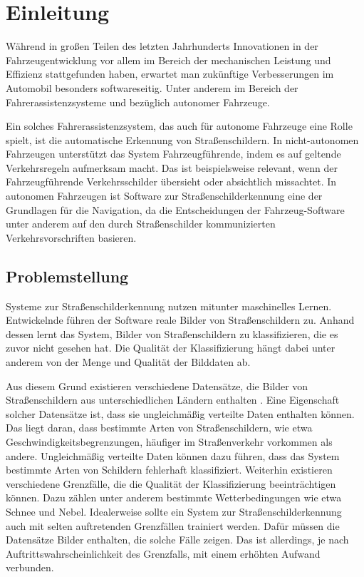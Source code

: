 \chapter{Einleitung}

Während in großen Teilen des letzten Jahrhunderts Innovationen in der Fahrzeugentwicklung vor allem im Bereich der mechanischen Leistung und Effizienz stattgefunden haben, erwartet man zukünftige Verbesserungen im Automobil besonders softwareseitig. Unter anderem im Bereich der Fahrerassistenzsysteme und bezüglich autonomer Fahrzeuge. \cite{Staron2021}

Ein solches Fahrerassistenzsystem, das auch für autonome Fahrzeuge eine Rolle spielt, ist die automatische Erkennung von Straßenschildern. In nicht-autonomen Fahrzeugen unterstützt das System Fahrzeugführende, indem es auf geltende Verkehrsregeln aufmerksam macht. Das ist beispielsweise relevant, wenn der Fahrzeugführende Verkehrsschilder übersieht oder absichtlich missachtet. In autonomen Fahrzeugen ist Software zur Straßenschilderkennung eine der Grundlagen für die Navigation, da die Entscheidungen der Fahrzeug-Software unter anderem auf den durch Straßenschilder kommunizierten Verkehrsvorschriften basieren. \cite{traffic-sign-detection-review-2014}

\section{Problemstellung}

Systeme zur Straßenschilderkennung nutzen mitunter maschinelles Lernen. Entwickelnde führen der Software reale Bilder von Straßenschildern zu. Anhand dessen lernt das System, Bilder von Straßenschildern zu klassifizieren, die es zuvor nicht gesehen hat. Die Qualität der Klassifizierung hängt dabei unter anderem von der Menge und Qualität der Bilddaten ab. \cite{traffic-sign-detection-review-2014}

Aus diesem Grund existieren verschiedene Datensätze, die Bilder von Straßenschildern aus unterschiedlichen Ländern enthalten \cite{GTSRB}. Eine Eigenschaft solcher Datensätze ist, dass sie ungleichmäßig verteilte Daten enthalten können. Das liegt daran, dass bestimmte Arten von Straßenschildern, wie etwa Geschwindigkeitsbegrenzungen, häufiger im Straßenverkehr vorkommen als andere. Ungleichmäßig verteilte Daten können dazu führen, dass das System bestimmte Arten von Schildern fehlerhaft klassifiziert. Weiterhin existieren verschiedene Grenzfälle, die die Qualität der Klassifizierung beeinträchtigen können. Dazu zählen unter anderem bestimmte Wetterbedingungen wie etwa Schnee und Nebel. Idealerweise sollte ein System zur Straßenschilderkennung auch mit selten auftretenden Grenzfällen trainiert werden. Dafür müssen die Datensätze Bilder enthalten, die solche Fälle zeigen. Das ist allerdings, je nach Auftrittswahrscheinlichkeit des Grenzfalls, mit einem erhöhten Aufwand verbunden.

